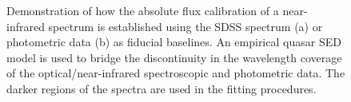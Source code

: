 \begin{figure}
    \captionsetup[subfigure]{labelformat=empty}
    \centering
    \subfloat[\label{fig:normalise_to_sdss_a}]{}
    \subfloat[\label{fig:normalise_to_sdss_b}]{}    
    \caption[{Demonstration of how the absolute flux calibration of a near-infrared spectrum is established.}]{Demonstration of how the absolute flux calibration of a near-infrared spectrum is established using the SDSS spectrum (a) or photometric data (b) as fiducial baselines. An empirical quasar SED model is used to bridge the discontinuity in the wavelength coverage of the optical/near-infrared spectroscopic and photometric data. The darker regions of the spectra are used in the fitting procedures.}     
    \label{fig:normalise_to_sdss}
\end{figure}

